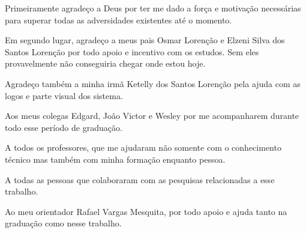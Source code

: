 \begin{agradecimentos}
Primeiramente agradeço a Deus por ter me dado a força e motivação necessárias para superar todas as adversidades existentes até o momento.

Em segundo lugar, agradeço a meus pais Osmar Lorenção e Elzeni Silva dos Santos Lorenção por todo apoio e incentivo com os estudos. Sem eles provavelmente não conseguiria chegar onde estou hoje.

Agradeço também a minha irmã Ketelly dos Santos Lorenção pela ajuda com as logos e parte visual dos sistema.

Aos meus colegas Edgard, João Victor e Wesley por me acompanharem durante todo esse período de graduação.

A todos os professores, que me ajudaram não somente com o conhecimento técnico mas também com minha formação enquanto pessoa.

A todas as pessoas que colaboraram com as pesquisas relacionadas a esse trabalho.

Ao meu orientador Rafael Vargas Mesquita, por todo apoio e ajuda tanto na graduação como nesse trabalho.

\end{agradecimentos}